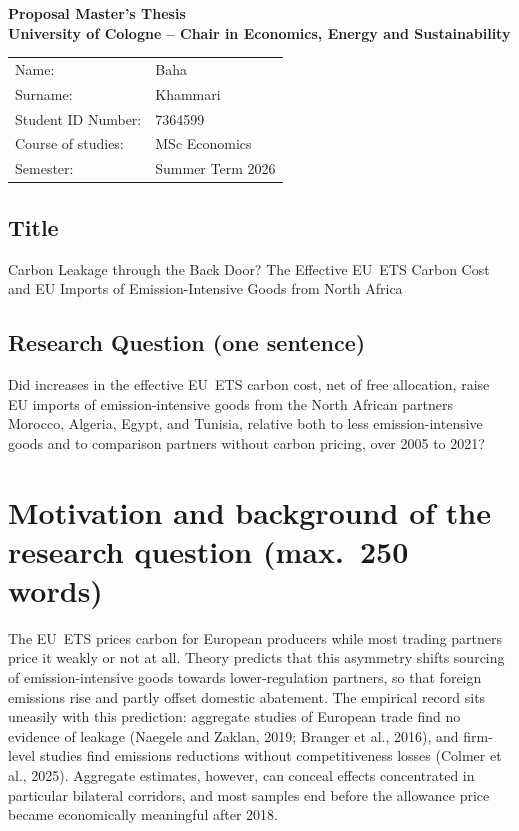 \documentclass[12pt,a4paper]{article}
\begin{document}
\begin{center}
{\LARGE\bfseries Proposal Master's Thesis}\\[0.2cm]
{\large\bfseries University of Cologne -- Chair in Economics, Energy and Sustainability}
\end{center}

\vspace{0.5cm}

\begin{tabular}{@{}ll@{}}
Name: & Baha \\
Surname: & Khammari \\
Student ID Number: & 7364599 \\
Course of studies: & MSc Economics \\
Semester: & Summer Term 2026 \\
\end{tabular}

\vspace{0.6cm}

\subsection*{Title}

Carbon Leakage through the Back Door? The Effective EU~ETS Carbon Cost and EU Imports of Emission-Intensive Goods from North Africa

\subsection*{Research Question (one sentence)}

Did increases in the effective EU~ETS carbon cost, net of free allocation, raise EU imports of emission-intensive goods from the North African partners Morocco, Algeria, Egypt, and Tunisia, relative both to less emission-intensive goods and to comparison partners without carbon pricing, over 2005 to 2021?

\section{Motivation and background of the research question (max.\ 250 words)}

The EU~ETS prices carbon for European producers while most trading partners price it weakly or not at all. Theory predicts that this asymmetry shifts sourcing of emission-intensive goods towards lower-regulation partners, so that foreign emissions rise and partly offset domestic abatement. The empirical record sits uneasily with this prediction: aggregate studies of European trade find no evidence of leakage (Naegele and Zaklan, 2019; Branger et al., 2016), and firm-level studies find emissions reductions without competitiveness losses (Colmer et al., 2025). Aggregate estimates, however, can conceal effects concentrated in particular bilateral corridors, and most samples end before the allowance price became economically meaningful after 2018.
\end{document}
